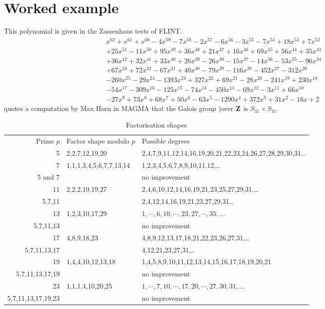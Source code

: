 \documentclass{llncs}
\begin{document}
\section{Worked example}
This polynomial is given in the Zassenhaus tests of FLINT.
\begin{equation}
\begin{array}{l}
x^{62}+x^{61}+x^{60}-4 x^{59}-7 x^{58}-2 x^{57}-6 x^{56}-3 x^{55}-7 x^{54}+18 x^{53}+7 x^{52}\\+25 x^{51}-11 x^{50}+95 x^{49}+36 x^{48}+21 x^{47}+16 x^{46}+69 x^{45}+56 x^{44}+35 x^{43}\\+36 x^{42}+32 x^{41}+33 x^{40}+26 x^{39}-26 x^{38}-15 x^{37}-14 x^{36}-53 x^{35}-96 x^{34}\\+67 x^{33}+72 x^{32}-67 x^{31}+40 x^{30}-79 x^{29}-116 x^{28}-452 x^{27}-312 x^{26}\\-260 x^{25}-29 x^{24}-1393 x^{23}+327 x^{22}+69 x^{21}-28 x^{20}-241 x^{19}+230 x^{18}\\-54 x^{17}-309 x^{16}-125 x^{15}-74 x^{14}-450 x^{13}-69 x^{12}-3 x^{11}+66 x^{10}\\-27 x^{9}+73 x^{8}+68 x^{7}+50 x^{6}-63 x^{5}-1290 x^{4}+372 x^{3}+31 x^{2}-16 x +2
\end{array}
\end{equation}
\cite{Konovalov2023a} quotes a computation by Max Horn in MAGMA that the Galois group )over ${\bf Z}$ is $S_{31}\times S_{31}$.
\begin{table}
\caption{Factorisation shapes\label{tab:CZ}}
\begin{tabular}{rll}
Prime $p$\quad&Factor shape modulo $p$&Possible degrees\\
5&2,2,7,12,19,20&2,4,7,9,11,12,14,16,19,20,21,22,23,24,26,27,28,29,30,31\dots\\
7&1,1,1,3,4,5,6,7,7,13,14&1,2,3,4,5,6,7,8,9,10,11,12,\dots\\
5 and 7&&no improvement\\
11&2,2,2,10,19,27&2,4,6,10,12,14,16,19,21,23,25,27,29,31,\dots\\
5,7,11&&2,4,12,14,16,19,21,23,27,29,31\dots\\
\hline
13&1,2,3,10,17,29&$1,\cdots,6,10,\cdots,23,27,\cdots,35,\ldots$\\
5,7,11,13&&no improvement\\
17&4,8,9,18,23&4,8,9,12,13,17,18,21,22,23,26,27,31,\dots\\
5,7,11,13,17&&4,12,21,23,27,31,\dots\\
19&1,4,4,10,12,13,18&1,4,5,8,9,10,11,12,13,14,15,16,17,18,19,20,21\\
5,7,11,13,17,19&&no improvement\\
23&1,1,1,4,10,20,25&$1,\cdots,7,10,\cdots,17,20,\cdots,27,30,31,\ldots$\\
5,7,11,13,17,19,23&&no improvement\\
\end{tabular}
\end{table}
\end{document}
